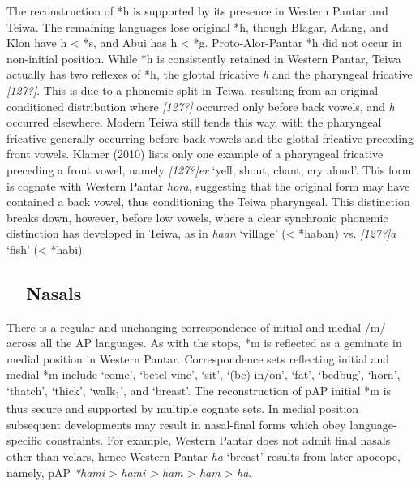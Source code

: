 The reconstruction of *h is supported by its presence in Western Pantar and Teiwa. The remaining languages lose original *h, though Blagar, Adang, and Klon have h {\textless} *s, and Abui has h {\textless} *g. Proto-Alor-Pantar *h did not occur in non-initial position. While *h is consistently retained in Western Pantar, Teiwa actually has two reflexes of *h, the glottal fricative \textit{h} and the pharyngeal fricative \textit{[127?]}. This is due to a phonemic split in Teiwa, resulting from an original conditioned distribution where \textit{[127?]} occurred only before back vowels, and \textit{h} occurred elsewhere. Modern Teiwa still tends this way, with the pharyngeal fricative generally occurring before back vowels and the glottal fricative preceding front vowels. Klamer (2010) lists only one example of a pharyngeal fricative preceding a front vowel, namely \textit{[127?]er} {\textquoteleft}yell, shout, chant, cry aloud{\textquoteright}. This form is cognate with Western Pantar \textit{hora{\ng}}, 
suggesting that the original form may have contained a back vowel, thus conditioning the Teiwa pharyngeal. This distinction breaks down, however, before low vowels, where a clear synchronic phonemic distinction has developed in Teiwa, as in \textit{ha{\textphi}an }{\textquoteleft}village{\textquoteright} ({\textless} *haban) vs. \textit{[127?]a{\textphi} }{\textquoteleft}fish{\textquoteright} ({\textless} *habi). 

\subsection[\ \ Nasals]{\ \ Nasals}
\hypertarget{RefHeading49921871885726}{}There is a regular and unchanging correspondence of initial and medial /m/\textit{ }across all the AP languages. As with the stops, *m is reflected as a geminate in medial position in Western Pantar. Correspondence sets reflecting initial and medial *m include {\textquoteleft}come{\textquoteright}, {\textquoteleft}betel vine{\textquoteright}, {\textquoteleft}sit{\textquoteright}, {\textquoteleft}(be) in/on{\textquoteright}, {\textquoteleft}fat{\textquoteright}, {\textquoteleft}bedbug{\textquoteright}, {\textquoteleft}horn{\textquoteright}, {\textquoteleft}thatch{\textquoteright}, {\textquoteleft}thick{\textquoteright}, {\textquoteleft}walk\textsubscript{1}{\textquoteright}, and {\textquoteleft}breast{\textquoteright}. The reconstruction of pAP initial *m is thus secure and supported by multiple cognate sets. In medial position subsequent developments may result in nasal-final forms which obey language-specific constraints. For example, Western Pantar does not admit 
final nasals other than velars, hence Western Pantar \textit{ha{\ng} }{\textquoteleft}breast{\textquoteright} results from later apocope, namely, pAP \textit{*hami} {\textgreater} \textit{ham{\textlengthmark}i {\textgreater}} \textit{ham{\textlengthmark}} {\textgreater} \textit{ham} {\textgreater} \textit{ha}\textit{{\ng}}.

